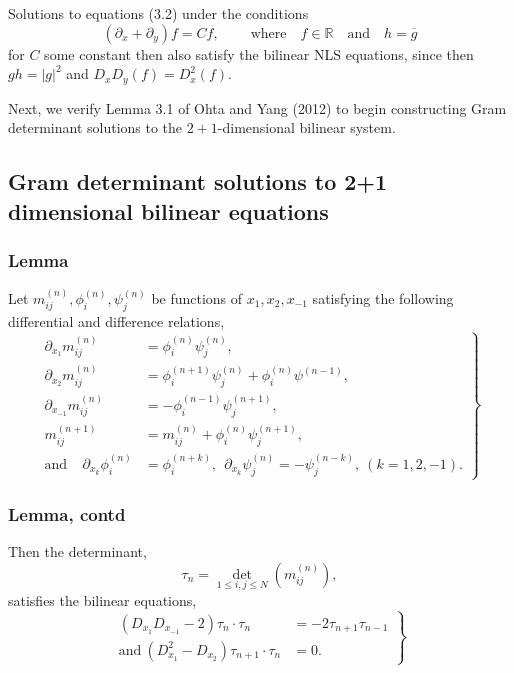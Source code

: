 \documentclass{beamer}
\def\RR{\mathbb{R}}
\theoremstyle{plain}
\theoremstyle{definition}
\begin{document}
\frame
{

Solutions to equations (3.2) under the conditions
\begin{equation*}\tag{3.3}
(\partial _x + \partial _y)f = Cf, ~~~~~~~~~~\text{where}\quad f\in\RR\quad\text{and}\quad h=\overline{g}
\end{equation*}
for $C$ some constant then also satisfy the bilinear NLS equations, since then $gh=|g|^2$ and $D_xD_y (f) = D_x ^2 (f)$.

Next, we verify Lemma 3.1 of Ohta and Yang (2012) to begin constructing Gram determinant solutions to the $2+1$-dimensional bilinear system.
}

\subsection{Gram determinant solutions to 2+1 dimensional bilinear equations}

\frame
{
\frametitle{Lemma} Let $m_{ij}^{(n)}, \phi _i ^{(n)} , \psi _j ^{(n)}$ be functions of $x_1 , x_2, x_{-1}$ satisfying the following differential and difference relations, $$ \left. \begin{array}{rl} \partial _{x_1} m_{ij} ^{(n)} & = \phi _i ^{(n)} \psi _j ^{(n)} ,\\
\partial _{x_2} m_{ij} ^{(n)} & = \phi _i ^{(n+1)} \psi _j ^{(n)} + \phi _i ^{(n)} \psi ^{(n-1)} ,\\
\partial _{x_{-1} } m_{ij} ^{(n)} & = -\phi _i ^{(n-1)} \psi _j ^{(n+1)},\\
m _{ij} ^{(n+1)} & = m_{ij} ^{(n)} + \phi _i ^{(n)} \psi _j ^{(n+1)} ,\\
\text{and}~~~~~\partial _{x_k} \phi _i ^{(n)} & = \phi _i ^{(n+k)}, ~~\partial _{x_k} \psi _j ^{(n)}=-\psi _j ^{(n-k)}, ~(k=1,2,-1). \end{array} \right \} $$
}

\frame
{
\frametitle{Lemma, contd} 
Then the determinant, $$\tau _n = \det _{1\leq i,j \leq N} \left ( m_{ij} ^{(n)} \right ),$$ satisfies the bilinear equations,
$$ \left. \begin{array}{rl} ( D_{x_1} D_{x_{-1}} -2 ) \tau _n \cdot \tau _n & = -2 \tau _{n+1} \tau _{n-1}\\
\text{and} ~(D_{x_1} ^2 - D_{x_2} ) \tau _{n+1} \cdot \tau _n & = 0 . \end{array} \right \} $$
}
\end{document}
